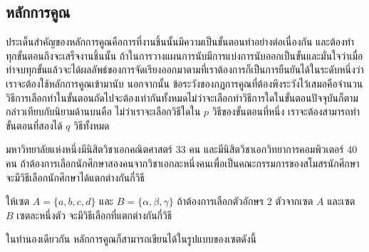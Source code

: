 \subsection{หลักการคูณ}


ประเด็นสำคัญของหลักการคูณคือการที่งานชิ้นนั้นมีความเป็นขั้นตอนทำอย่างต่อเนื่องกัน และต้องทำทุกขั้นตอนถึงจะเสร็จงานชิ้นนั้น ถ้าในการวางแผนการนับมีการแบ่งการนับออกเป็นขั้นและมั่นใจว่าเมื่อทำจบทุกขั้นแล้วจะได้ผลลัพธ์ของการจัดเรียงออกมาตามที่เราต้องการก็เป็นการยืนยันได้ในระดับหนึ่งว่าเราจะต้องใช้หลักการคูณเข้ามานับ นอกจากนั้น ข้อระวังของกฏการคูณที่ต้องพึงระวังไว้เสมอคือจำนวนวิธีการเลือกทำในขั้นตอนถัดไปจะต้องเท่ากันทั้งหมดไม่ว่าจะเลือกทำวิธีการใดในขั้นตอนปัจจุบันก็ตาม กล่าวเทียบกับนิยามด้านบนคือ ไม่ว่าเราจะเลือกวิธีใดใน $ p $ วิธีของขั้นตอนที่หนึ่ง เราจะต้องสามารถทำขั้นตอนที่สองได้ $ q $ วิธีทั้งหมด\\


\begin{exam}
	มหาวิทยาลัยแห่งหนึ่งมีนิสิตวิชาเอกคณิตศาสตร์ 33 คน และมีนิสิตวิชาเอกวิทยาการคอมพิวเตอร์ 40 คน ถ้าต้องการเลือกนักศึกษาสองคนจากวิชาเอกละหนึ่งคนเพื่อเป็นคณะกรรมการของสโมสรนักศึกษา จะมีวิธีเลือกนักศึกษาได้แตกต่างกันกี่วิธี
\end{exam}
\begin{exam}
	ให้เซต $ A=\{a,b,c,d\} $ และ $ B=\{\alpha,\beta,\gamma\} $ ถ้าต้องการเลือกตัวอักษร 2 ตัวจากเซต $ A $ และเซต $ B $ เซตละหนึ่งตัว จะมีวิธีเลือกที่แตกต่างกันกี่วิธี
\end{exam}
ในทำนองเดียวกัน หลักการคูณก็สามารถเขียนได้ในรูปแบบของเซตดังนี้\\


